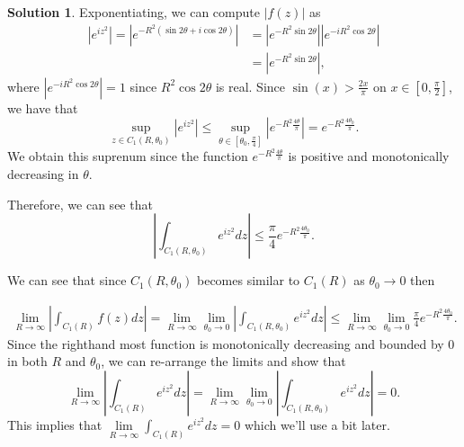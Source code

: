 \documentclass[12pt]{article}
\newcommand{\abs}[1]{ \left| #1 \right| }
\theoremstyle{definition}
\newtheorem{sol}{Solution}
\theoremstyle{remark}
\begin{document}
\begin{sol}
Exponentiating, we can compute $\abs{f(z)}$ as 
\begin{align}
    \abs{e^{iz^2}} = \abs{ e^{-R^2(\sin2\theta + i\cos2\theta)} } &= \abs{e^{-R^2 \sin2\theta}} \abs{e^{-iR^2\cos2\theta}}\\
                                                                  &= \abs{e^{-R^2 \sin2\theta}},
\end{align}
where $\abs{e^{-iR^2\cos2\theta}} =1$ since $R^2\cos2\theta$ is real. Since $\sin(x)> \frac{2x}{\pi}$ on $x\in[0,\frac{\pi}{2}]$, we have that 
\begin{equation}
    \sup_{z\in  C_1(R,\theta_0)} \abs{e^{iz^2}} \leq \sup_{\theta \in [\theta_0, \frac{\pi}{4}]} \abs{e^{-R^2 \frac{4\theta}{\pi}}} = e^{-R^2 \frac{4\theta_0}{\pi}}. 
\end{equation}
We obtain this suprenum since the function $e^{-R^2\frac{4\theta}{\pi}}$ is positive and monotonically decreasing in $\theta$.

Therefore, we can see that 
\begin{equation}
    \abs{\int_{C_1(R,\theta_0)} e^{iz^2}dz} \leq  \frac{\pi}{4} e^{-R^2\frac{4\theta_0}{\pi}} .
\end{equation}

We can see that since $C_1(R,\theta_0)$ becomes similar to $C_1(R)$ as $\theta_0 \to 0$ then

\begin{align}
    \lim\limits_{R\to\infty}\abs{\int_{C_1(R)} f(z)dz } = \lim\limits_{R\to\infty}\lim\limits_{\theta_0\to 0} \abs{\int_{C_1(R,\theta_0)} e^{iz^2}dz} \leq  \lim\limits_{R\to\infty}\lim\limits_{\theta_0\to 0}\frac{\pi}{4} e^{-R^2\frac{4\theta_0}{\pi}}.
\end{align}
    Since the righthand most function is monotonically decreasing and bounded by 0 in both $R$ and $\theta_0$, we can re-arrange the limits and show that 
    \begin{equation}
        \lim\limits_{R\to\infty}\abs{\int_{C_1(R)}  e^{iz^2}dz } = \lim\limits_{R\to\infty}\lim\limits_{\theta_0\to 0} \abs{\int_{C_1(R,\theta_0)} e^{iz^2}dz} = 0.
    \end{equation}
    This implies that $\lim\limits_{R\to\infty}\int_{C_1(R)}  e^{iz^2}dz = 0$ which we'll use a bit later.


\end{sol}
\end{document}
